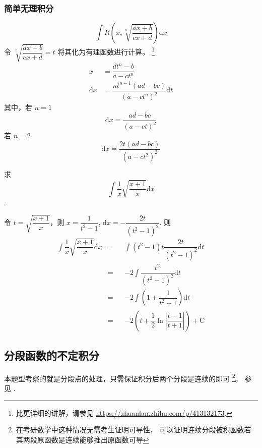 \documentclass{beaulivre}
\begin{document}
\subsubsection{简单无理积分} \label{simple-irrational-integral}

\begin{equation}
    \int R\left(x, \sqrt[n]{\dfrac{ax+b}{cx+d}}\right) \mathrm{d} x
\end{equation}
令 $\sqrt[n]{\dfrac{ax+b}{cx+d}}=t$ 将其化为有理函数进行计算。
\footnote{
    比\cite{we}更详细的讲解，请参见
    \url{https://zhuanlan.zhihu.com/p/413132173}.
}
\begin{align*}
    x &= \dfrac{d t^n-b}{a-c t^n} \\
    \mathrm{d} x &= \dfrac{n t^{n-1} (a d-b c)}{\left(a-c t^n\right)^2} \mathrm{d} t
\end{align*}
其中，若 $n = 1$
\begin{equation}
    \mathrm{d} x = \dfrac{ad-bc}{(a-ct)^2}
\end{equation}
若 $n = 2$
\begin{equation}
    \mathrm{d} x = \dfrac{2t(ad-bc)}{(a-ct^2)^2}
\end{equation}

\begin{example}
    求
    \[
        \int \dfrac{1}{x} \sqrt{\dfrac{x+1}{x}} \mathrm{d} x
    \].

    令 $t =\sqrt{\dfrac{x+1}{x}}$，则 $x = \dfrac{1}{t^2 - 1}$,
    $\mathrm{d}x = - \dfrac{2t}{(t^2 - 1)^2}$.
    则
    \begin{align*}
        \int \dfrac{1}{x} \sqrt{\dfrac{x+1}{x}} \mathrm{d} x 
        &=& 
        &\int (t^2 - 1) t \dfrac{2t}{(t^2-1)^2} \mathrm{d} t \\
        &=& 
        &-2 \int \dfrac{t^2}{(t^2-1)^2} \mathrm{d} t\\
        &=& 
        &-2 \int \left(1+\dfrac{1}{t^2-1}\right) \mathrm{d} t\\
        &=& 
        &-2\left(t + \dfrac{1}{2} \ln \left|\dfrac{t-1}{t+1}\right|\right) + \mathrm{C}
    \end{align*}
\end{example}

\subsection{分段函数的不定积分}

本题型考察的就是分段点的处理，只需保证积分后两个分段是连续的即可
\footnote{在考研数学中这种情况无需考生证明可导性，
可以证明连续分段被积函数若其两段原函数是连续能够推出原函数可导}。
参见 \cite[page 101, pdf 112, example 5]{we}.
\end{document}
